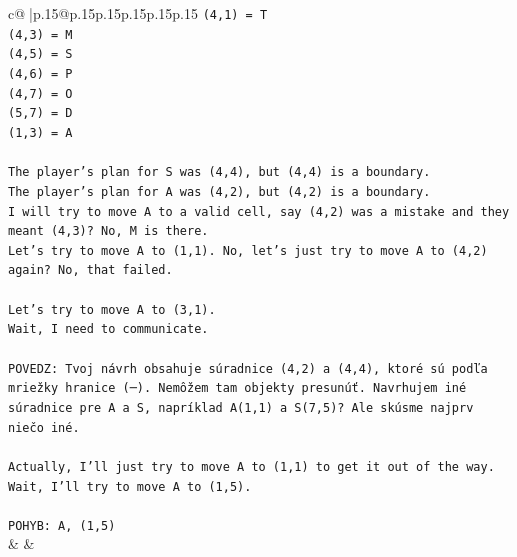 \documentclass{article}
\begin{document}
{\begin{supertabular}{c@{$\;$}|p{.15\linewidth}@{}p{.15\linewidth}p{.15\linewidth}p{.15\linewidth}p{.15\linewidth}p{.15\linewidth}}
{{{\texttt{(4,1) = T} \\
\texttt{(4,3) = M} \\
\texttt{(4,5) = S} \\
\texttt{(4,6) = P} \\
\texttt{(4,7) = O} \\
\texttt{(5,7) = D} \\
\texttt{(1,3) = A} \\
\\ 
\texttt{The player's plan for S was (4,4), but (4,4) is a boundary.} \\
\texttt{The player's plan for A was (4,2), but (4,2) is a boundary.} \\
\texttt{I will try to move A to a valid cell, say (4,2) was a mistake and they meant (4,3)? No, M is there.} \\
\texttt{Let's try to move A to (1,1). No, let's just try to move A to (4,2) again? No, that failed.} \\
\\ 
\texttt{Let's try to move A to (3,1).} \\
\texttt{Wait, I need to communicate.} \\
\\ 
\texttt{POVEDZ: Tvoj návrh obsahuje súradnice (4,2) a (4,4), ktoré sú podľa mriežky hranice (─). Nemôžem tam objekty presunúť. Navrhujem iné súradnice pre A a S, napríklad A(1,1) a S(7,5)? Ale skúsme najprv niečo iné.} \\
\\ 
\texttt{Actually, I'll just try to move A to (1,1) to get it out of the way.} \\
\texttt{Wait, I'll try to move A to (1,5).} \\
\\ 
\texttt{POHYB: A, (1,5)} \\
            }
        }
    }
    & & \\ \\


\end{supertabular}}
\end{document}
